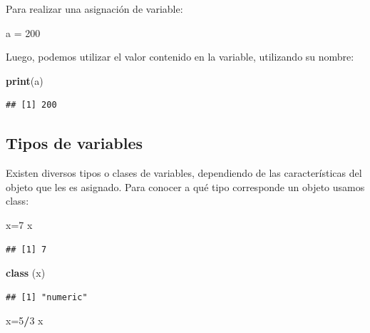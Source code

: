 \documentclass[
]{book}
\newenvironment{Shaded}{\begin{snugshade}}{\end{snugshade}}
\newcommand{\DecValTok}[1]{\textcolor[rgb]{0.00,0.00,0.81}{#1}}
\newcommand{\FunctionTok}[1]{\textcolor[rgb]{0.13,0.29,0.53}{\textbf{#1}}}
\newcommand{\NormalTok}[1]{#1}
\newcommand{\OtherTok}[1]{\textcolor[rgb]{0.56,0.35,0.01}{#1}}
\newcommand{\SpecialCharTok}[1]{\textcolor[rgb]{0.81,0.36,0.00}{\textbf{#1}}}
\begin{document}
Para realizar una asignación de variable:

\begin{Shaded}
\begin{Highlighting}[]
\NormalTok{a }\OtherTok{=} \DecValTok{200}
\end{Highlighting}
\end{Shaded}

Luego, podemos utilizar el valor contenido en la variable, utilizando su
nombre:

\begin{Shaded}
\begin{Highlighting}[]
\FunctionTok{print}\NormalTok{(a)}
\end{Highlighting}
\end{Shaded}

\begin{verbatim}
## [1] 200
\end{verbatim}

\hypertarget{tipos-de-variables}{%
\subsection{Tipos de variables}\label{tipos-de-variables}}

Existen diversos tipos o clases de variables, dependiendo de las
características del objeto que les es asignado. Para conocer a qué tipo
corresponde un objeto usamos class:

\begin{Shaded}
\begin{Highlighting}[]
\NormalTok{x}\OtherTok{=}\DecValTok{7}
\NormalTok{x}
\end{Highlighting}
\end{Shaded}

\begin{verbatim}
## [1] 7
\end{verbatim}

\begin{Shaded}
\begin{Highlighting}[]
\FunctionTok{class}\NormalTok{ (x)}
\end{Highlighting}
\end{Shaded}

\begin{verbatim}
## [1] "numeric"
\end{verbatim}

\begin{Shaded}
\begin{Highlighting}[]
\NormalTok{x}\OtherTok{=}\DecValTok{5}\SpecialCharTok{/}\DecValTok{3}
\NormalTok{x}
\end{Highlighting}
\end{Shaded}
\end{document}
